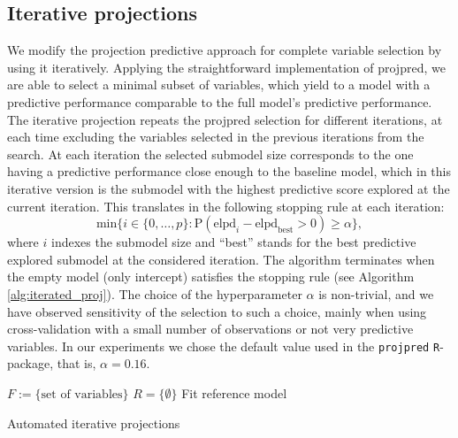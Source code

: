 \documentclass[a4]{article}
\theoremstyle{definition}
\begin{document}
\subsection{Iterative projections}

We modify the projection predictive approach for complete variable
selection by using it iteratively.  Applying the straightforward
implementation of projpred, we are able to select a minimal subset of
variables, which yield to a model with a predictive performance
comparable to the full model's predictive performance. 
 The iterative projection repeats
the projpred selection for different iterations, at each time
excluding the variables selected in the previous
iterations from the search.
 At each iteration the selected submodel size corresponds to the
one having a predictive performance close enough to the baseline
model, which in this iterative version is the submodel with the
highest predictive score explored at the current iteration. This translates
in the following stopping rule at each iteration:
\begin{equation} 
\label{eq:rule_of_thumb}
\text{min} \{i\in \{0,\ldots,p\}: \text{P}(\text{elpd}_{i}-\text{elpd}_{\text{best}}>0)\geq \alpha \},
\end{equation}
where $i$ indexes the submodel size and ``best'' stands for the best predictive explored submodel
at the considered iteration. The algorithm terminates when the empty model (only intercept) satisfies
the stopping rule (see Algorithm \ref{alg:iterated_proj}).
The choice of the hyperparameter $\alpha$ is non-trivial, and we have 
observed sensitivity of the selection to such a choice, mainly when using cross-validation with a small
number of observations or not very predictive variables. 
In our experiments we chose the default value used in the \texttt{projpred} 
\texttt{R}-package, that is, $\alpha=0.16$.

\begin{center}
\begin{algorithm}[H]
\SetAlgoLined
{}
 $F:=\{\text{set of variables}\}$ \;
 $R=\{\emptyset\}$ \;
 Fit reference model\;
 \caption{Automated iterative projections}
 \label{alg:iterated_proj}
\end{algorithm}
\end{center}
\end{document}
